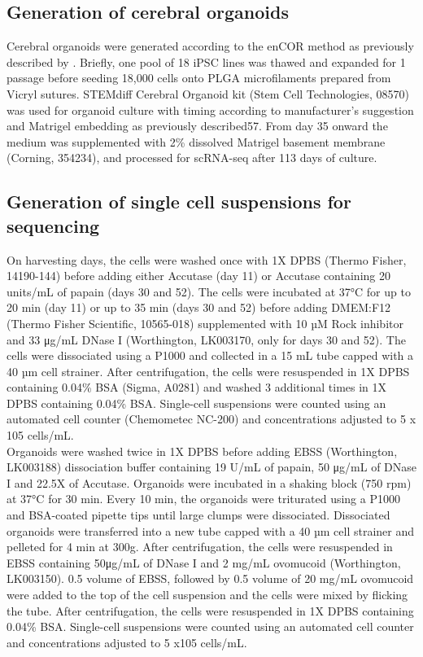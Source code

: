 \subsection{Generation of cerebral organoids}
Cerebral organoids were generated according to the enCOR method as previously described by \cite{lancaster2017guided}. 
Briefly, one pool of 18 iPSC lines was thawed and expanded for 1 passage before seeding 18,000 cells onto PLGA microfilaments prepared from Vicryl sutures. 
STEMdiff Cerebral Organoid kit (Stem Cell Technologies, 08570) was used for organoid culture with timing according to manufacturer's suggestion and Matrigel embedding as previously described57. 
From day 35 onward the medium was supplemented with 2\% dissolved Matrigel basement membrane (Corning, 354234), and processed for scRNA-seq after 113 days of culture. 

\subsection{Generation of single cell suspensions for sequencing}
On harvesting days, the cells were washed once with 1X DPBS (Thermo Fisher, 14190-144) before adding either Accutase (day 11) or Accutase containing 20 units/mL of papain (days 30 and 52). 
The cells were incubated at 37°C for up to 20 min (day 11) or up to 35 min (days 30 and 52) before adding DMEM:F12 (Thermo Fisher Scientific, 10565-018) supplemented with 10 µM Rock inhibitor and 33 μg/mL DNase I (Worthington, LK003170, only for days 30 and 52). 
The cells were dissociated using a P1000 and collected in a 15 mL tube capped with a 40 µm cell strainer. 
After centrifugation, the cells were resuspended in 1X DPBS containing 0.04\% BSA (Sigma, A0281) and washed 3 additional times in 1X DPBS containing 0.04\% BSA. Single-cell suspensions were counted using an automated cell counter (Chemometec NC-200) and concentrations adjusted to 5 x 105 cells/mL. \\

Organoids were washed twice in 1X DPBS before adding EBSS (Worthington, LK003188)  dissociation buffer containing 19 U/mL of papain, 50 μg/mL of DNase I and 22.5X of Accutase.
Organoids were incubated in a shaking block (750 rpm) at 37°C for 30 min. 
Every 10 min, the organoids were triturated using a P1000 and BSA-coated  pipette tips until large clumps were dissociated. 
Dissociated organoids were transferred into a new tube capped with a 40 µm cell strainer and pelleted for 4 min at 300g. 
After centrifugation, the cells were resuspended in EBSS containing 50μg/mL of DNase I and 2 mg/mL ovomucoid (Worthington, LK003150). 
0.5 volume of EBSS, followed by 0.5 volume of 20 mg/mL ovomucoid were added to the top of the cell suspension and the cells were mixed by flicking the tube. 
After centrifugation, the cells were resuspended in 1X DPBS containing 0.04\% BSA. 
Single-cell suspensions were counted using an automated cell counter and concentrations adjusted to 5 x105 cells/mL.

